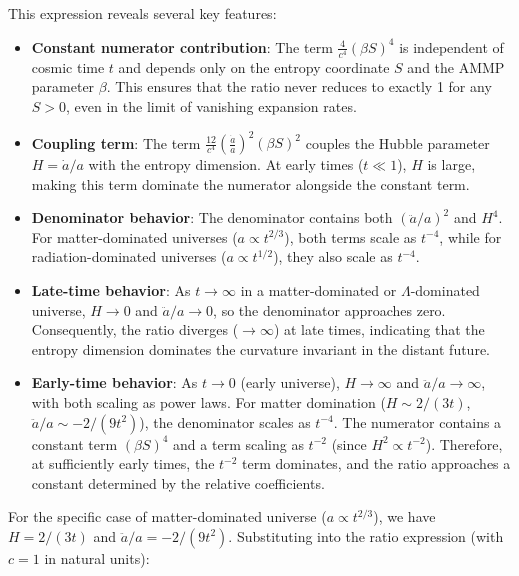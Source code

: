 \documentclass[11pt,a4paper]{article}
\begin{document}
This expression reveals several key features:

\begin{itemize}
    \item \textbf{Constant numerator contribution}: The term $\frac{4}{c^4}(\beta S)^4$ 
          is independent of cosmic time $t$ and depends only on the entropy 
          coordinate $S$ and the AMMP parameter $\beta$. This ensures that 
          the ratio never reduces to exactly 1 for any $S > 0$, even in the 
          limit of vanishing expansion rates.

    \item \textbf{Coupling term}: The term $\frac{12}{c^4}\left(\frac{\dot{a}}{a}\right)^2 (\beta S)^2$ 
          couples the Hubble parameter $H = \dot{a}/a$ with the entropy 
          dimension. At early times ($t \ll 1$), $H$ is large, making this 
          term dominate the numerator alongside the constant term.

    \item \textbf{Denominator behavior}: The denominator contains both 
          $(\ddot{a}/a)^2$ and $H^4$. For matter-dominated universes 
          ($a \propto t^{2/3}$), both terms scale as $t^{-4}$, while for 
          radiation-dominated universes ($a \propto t^{1/2}$), they also scale 
          as $t^{-4}$.

    \item \textbf{Late-time behavior}: As $t \to \infty$ in a matter-dominated 
          or $\Lambda$-dominated universe, $H \to 0$ and $\ddot{a}/a \to 0$, 
          so the denominator approaches zero. Consequently, the ratio 
          diverges ($\to \infty$) at late times, indicating that the entropy 
          dimension dominates the curvature invariant in the distant future.

    \item \textbf{Early-time behavior}: As $t \to 0$ (early universe), 
          $H \to \infty$ and $\ddot{a}/a \to \infty$, with both scaling as 
          power laws. For matter domination ($H \sim 2/(3t)$, $\ddot{a}/a \sim -2/(9t^2)$), 
          the denominator scales as $t^{-4}$. The numerator contains a 
          constant term $(\beta S)^4$ and a term scaling as $t^{-2}$ (since 
          $H^2 \propto t^{-2}$). Therefore, at sufficiently early times, 
          the $t^{-2}$ term dominates, and the ratio approaches a constant 
          determined by the relative coefficients.
\end{itemize}

For the specific case of matter-dominated universe ($a \propto t^{2/3}$), 
we have $H = 2/(3t)$ and $\ddot{a}/a = -2/(9t^2)$. Substituting into the 
ratio expression (with $c=1$ in natural units):
\end{document}
